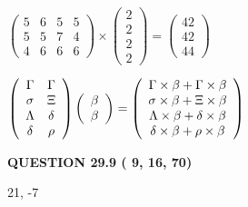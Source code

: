 \documentclass[12pt]{article}
\begin{document}
 
$\left( \begin{array}{ccccccccccccccc}
           5 & 
           6 & 
           5 & 
           5 \\ 
           5 & 
           5 & 
           7 & 
           4 \\ 
           4 & 
           6 & 
           6 & 
           6
\end{array}\right) \times
\left( \begin{array}{c}
           2 \\ 
           2 \\ 
           2 \\ 
           2
\end{array}\right)  =
\left( \begin{array}{c}
          42 \\ 
          42 \\ 
          44
\end{array}\right)  $
 
$  %
 \left( \begin{array}
 {
 c
 c
 }
 \Gamma & 
 \Gamma \\ 
 \sigma & 
                    \Xi \\ 
 \Lambda & 
 \delta \\ 
 \delta & 
 \rho
 \end{array} \right)
 \left( \begin{array}
 {
 c
 }
 \beta \\ 
 \beta
 \end{array} \right)
=
  \left( \begin{array}
 {
 c
 }
 \Gamma \times  \beta   +  \Gamma \times  \beta \\ 
 \sigma \times  \beta   +                     \Xi \times  \beta \\ 
 \Lambda \times  \beta   +  \delta \times  \beta \\ 
 \delta \times  \beta   +  \rho \times  \beta
 \end{array} \right)
$
 
 
 
  
\vspace{0.2in}
  
{\textbf{\Large{QUESTION
29.9 
 (          9,         16,         70)
}}}
  
  


 
 
\noindent{}

21,  %
-7
 
\end{document}
